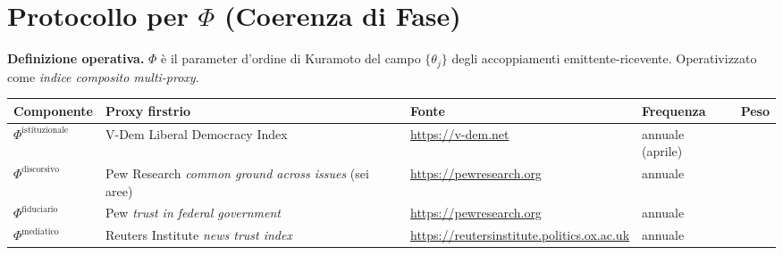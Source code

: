 \section{\texorpdfstring{Protocollo per \(\Phi\) (Coerenza di
Fase)}{Protocollo per \textbackslash Phi (Coerenza di Fase)}}\label{protocollo-per-phi-coerenza-di-fase}

\Hypoth{} \textbf{Definizione operativa.} \(\Phi\) è il parameter
d'ordine di Kuramoto del campo \(\{\theta_j\}\) degli accoppiamenti
emittente-ricevente. Operativizzato come \emph{indice composito
multi-proxy}.

{\def\LTcaptype{none} %
{\small\begin{longtable}[]{@{}
  >{\raggedright\arraybackslash}p{}
  >{\raggedright\arraybackslash}p{}
  >{\raggedright\arraybackslash}p{}
  >{\raggedright\arraybackslash}p{}
  >{\raggedright\arraybackslash}p{}@{}}
\toprule\noalign{}
\begin{minipage}[b]{\linewidth}\raggedright
Componente
\end{minipage} & \begin{minipage}[b]{\linewidth}\raggedright
Proxy firstrio
\end{minipage} & \begin{minipage}[b]{\linewidth}\raggedright
Fonte
\end{minipage} & \begin{minipage}[b]{\linewidth}\raggedright
Frequenza
\end{minipage} & \begin{minipage}[b]{\linewidth}\raggedright
Peso
\end{minipage} \\
\midrule\noalign{}
\endhead
\bottomrule\noalign{}
\endlastfoot
\(\Phi^{\text{istituzionale}}\) & V-Dem Liberal Democracy Index &
\url{https://v-dem.net} & annuale (aprile) & 0.40 \\
\(\Phi^{\text{discorsivo}}\) & Pew Research \emph{common ground across
issues} (sei aree) & \url{https://pewresearch.org} & annuale & 0.25 \\
\(\Phi^{\text{fiduciario}}\) & Pew \emph{trust in federal government} &
\url{https://pewresearch.org} & annuale & 0.20 \\
\(\Phi^{\text{mediatico}}\) & Reuters Institute \emph{news trust index}
& \url{https://reutersinstitute.politics.ox.ac.uk} & annuale & 0.15 \\
\end{longtable}}
}

